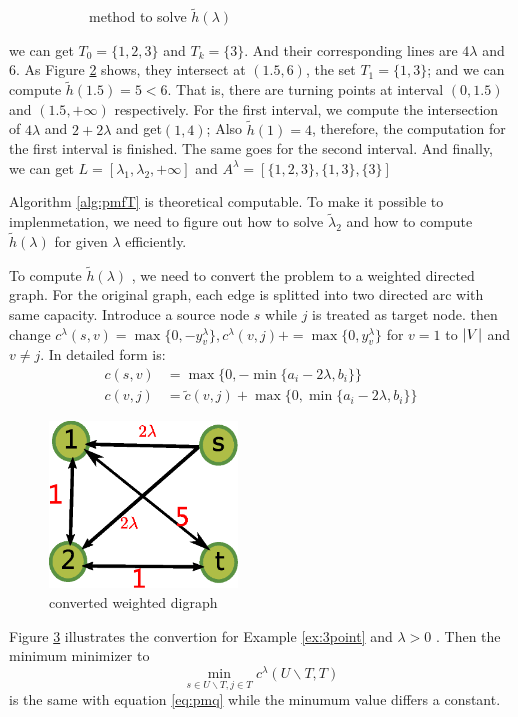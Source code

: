 \documentclass{article}
\begin{document}
\begin{example}
\begin{figure}[!ht]
\begin{subfigure}{0.45\textwidth}
\caption{method to solve $\tilde{h}(\lambda)$}\label{fig:linseg}
\end{subfigure}
\caption{}
\end{figure}
we can get $T_0 = \{1,2,3\} $ and $T_k = \{3\}$. And their corresponding lines are $4\lambda$ and $6$. As Figure \ref{fig:linseg} shows, they intersect at $(1.5,6)$, the set $T_1=\{1,3\}$; and we can compute $\tilde{h}(1.5)=5<6$. That is, there are turning points at interval $(0, 1.5)$ and $(1.5, +\infty)$ respectively. For the first interval, we compute the intersection of $4\lambda$ and $2+2\lambda$ and get$(1,4)$; Also $\tilde{h}(1)=4$, therefore, the computation for the first interval is finished. The same goes for the second interval. And finally, we can get $L=[\lambda_1, \lambda_2, +\infty]$ and $A^{\lambda} = [\{1,2,3\}, \{1,3\},\{3\}]$
\end{example}

Algorithm \ref{alg:pmfT} is theoretical computable. To make it possible to implenmetation, we need to figure out how to solve $\tilde{\lambda}_2$ and how to compute $\tilde{h}(\lambda)$ for given $\lambda$ efficiently.

To compute $\tilde{h}(\lambda)$ , we need to convert the problem to a weighted directed graph.
For the original graph, each edge is splitted into two directed arc with same capacity.
Introduce a source node $s$ while $j$ is treated as target node.  then change
$c^{\lambda}(s,v)=\max\{0, -y^{\lambda}_v\}, c^{\lambda}(v,j) += \max\{0, y^{\lambda}_v\}$ for $ v=1 $ to $\lvert V\rvert$ and $v \neq  j$.
In detailed form is:
\begin{align}
c(s, v) &=  \max\{0, -\min\{a_i-2\lambda, b_i\}\} \\
c(v, j) & = \tilde{c}(v, j) + \max\{0, \min\{a_i - 2\lambda, b_i\}\}
\end{align}
\begin{figure}
\centering
\includegraphics[width=5cm]{pic/example_st.eps}
\caption{converted weighted digraph}\label{fig:convert}
\end{figure}
Figure \ref{fig:convert} illustrates the convertion for Example \ref{ex:3point} and $\lambda>0$ .
Then the minimum minimizer to 
\begin{equation}\label{eq:pmqe}
\min_{s\in U\backslash T, j\in T}c^{\lambda}(U\backslash T, T)
\end{equation}
is the same with equation \eqref{eq:pmq} while the minumum value differs a constant.
\end{document}
